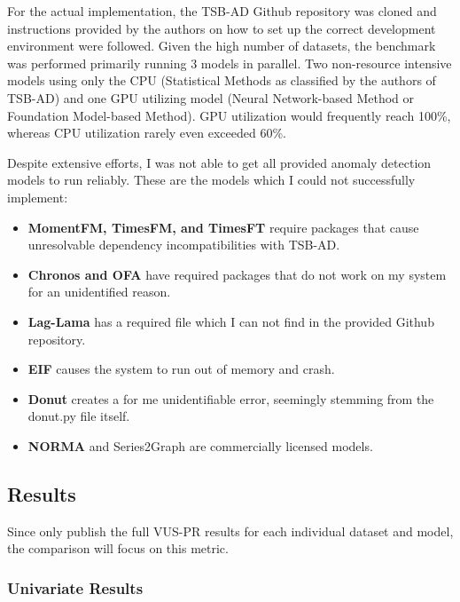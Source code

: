\documentclass[12pt,oneside]{article}
\begin{document}
For the actual implementation, the TSB-AD Github repository was cloned and instructions provided by the authors on how to set up the correct development environment were followed. Given the high number of datasets, the benchmark was performed primarily running 3 models in parallel. Two non-resource intensive models using only the CPU (Statistical Methods as classified by the authors of TSB-AD) and one GPU utilizing model (Neural Network-based Method or Foundation Model-based Method). GPU utilization would frequently reach 100\%, whereas CPU utilization rarely even exceeded 60\%.\par
Despite extensive efforts, I was not able to get all provided anomaly detection models to run reliably. These are the models which I could not successfully implement:

\begin{itemize}
    \item \textbf{MomentFM, TimesFM, and TimesFT} require packages that cause unresolvable dependency incompatibilities with TSB-AD.
    \item \textbf{Chronos and OFA} have required packages that do not work on my system for an unidentified reason. 
    \item \textbf{Lag-Lama} has a required file which I can not find in the provided Github repository.
    \item \textbf{EIF} causes the system to run out of memory and crash.
    \item \textbf{Donut} creates a for me unidentifiable error, seemingly stemming from the donut.py file itself.
    \item \textbf{NORMA} and Series2Graph are commercially licensed models. 
\end{itemize}

\subsection{Results}
Since \cite{liu2024elephant} only publish the full VUS-PR results for each individual dataset and model, the comparison will focus on this metric.
\subsubsection{Univariate Results}
\end{document}
